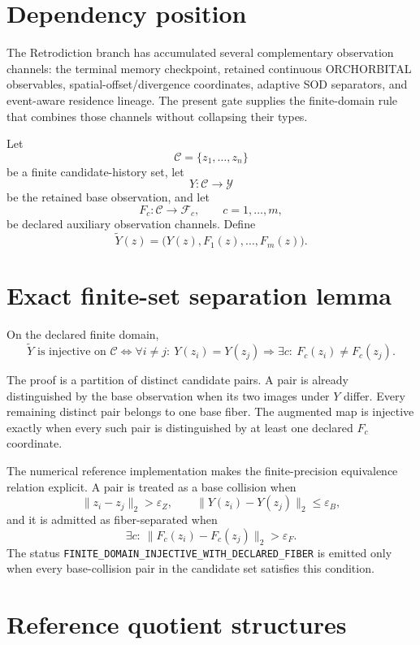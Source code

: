 \documentclass[11pt]{book}
\begin{document}
\section{Dependency position}

The Retrodiction branch has accumulated several complementary observation channels: the terminal memory checkpoint, retained continuous ORCHORBITAL observables, spatial-offset/divergence coordinates, adaptive SOD separators, and event-aware residence lineage.  The present gate supplies the finite-domain rule that combines those channels without collapsing their types.

Let
\[
\mathcal C=\{z_1,\ldots,z_n\}
\]
be a finite candidate-history set, let
\[
Y:\mathcal C\to\mathcal Y
\]
be the retained base observation, and let
\[
F_c:\mathcal C\to\mathcal F_c,
\qquad c=1,\ldots,m,
\]
be declared auxiliary observation channels.  Define
\[
\widetilde Y(z)
=\bigl(Y(z),F_1(z),\ldots,F_m(z)\bigr).
\]

\section{Exact finite-set separation lemma}

On the declared finite domain,
\[
\boxed{
\widetilde Y\text{ is injective on }\mathcal C
\iff
\forall i\ne j:\
Y(z_i)=Y(z_j)
\Longrightarrow
\exists c:\ F_c(z_i)\ne F_c(z_j).
}
\]

The proof is a partition of distinct candidate pairs.  A pair is already distinguished by the base observation when its two images under $Y$ differ.  Every remaining distinct pair belongs to one base fiber.  The augmented map is injective exactly when every such pair is distinguished by at least one declared $F_c$ coordinate.

The numerical reference implementation makes the finite-precision equivalence relation explicit.  A pair is treated as a base collision when
\[
\|z_i-z_j\|_2>\varepsilon_Z,
\qquad
\|Y(z_i)-Y(z_j)\|_2\le\varepsilon_B,
\]
and it is admitted as fiber-separated when
\[
\exists c:\
\|F_c(z_i)-F_c(z_j)\|_2>\varepsilon_F.
\]
The status
\texttt{FINITE\_DOMAIN\_INJECTIVE\_WITH\_DECLARED\_FIBER}
is emitted only when every base-collision pair in the candidate set satisfies this condition.

\section{Reference quotient structures}
\end{document}
